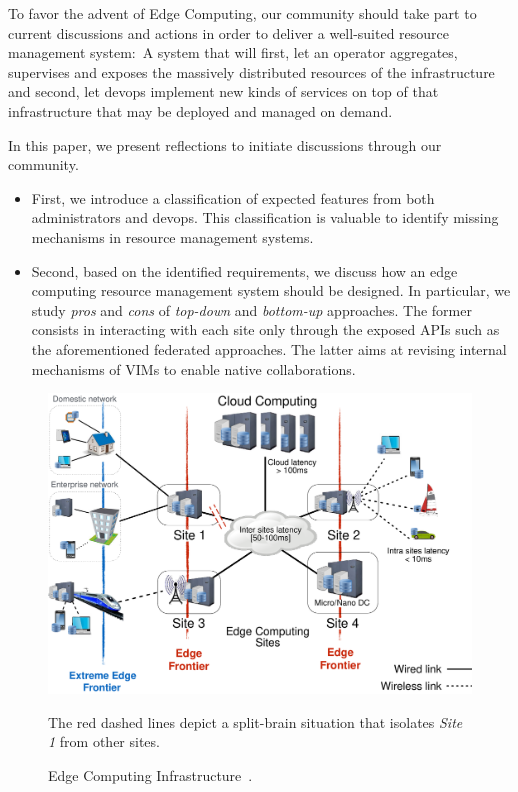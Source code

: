 To favor the advent of Edge Computing, our community should take part
to current discussions and actions in order to deliver a well-suited
resource management system:~A system that will first, let an operator
aggregates, supervises and exposes the massively distributed resources
of the infrastructure and second, let devops implement new kinds
of services on top of that infrastructure that may be deployed and
managed on demand.


In this paper, we present reflections to initiate discussions through our community.

\begin{itemize}
\item First, we introduce a classification of expected features from
  both administrators and devops. This classification is valuable to
  identify missing mechanisms in resource management systems.
\item Second, based on the identified requirements, we discuss
  how an edge computing resource management system
  should be designed. In particular, we study \emph{pros} and
  \emph{cons} of \emph{top-down} and \emph{bottom-up} approaches. The
  former consists in interacting with each site only through the
  exposed APIs such as the aforementioned federated approaches. The
  latter aims at revising internal mechanisms of VIMs to enable native
  collaborations.
  \end{itemize}

\begin{figure}[t]
  \centering
  \includegraphics[width=\columnwidth]{./figures/figure_fog.pdf}
  \caption{Edge Computing Infrastructure~\cite{7923796}.}
    {\small The red dashed lines depict a split-brain situation that isolates
    \emph{Site 1} from other sites.}
  \label{fig:fogedge-archi}
\end{figure}

